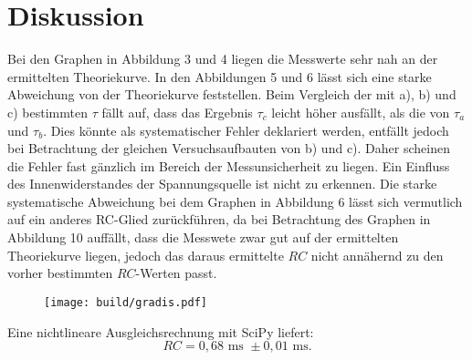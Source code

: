 \section{Diskussion}
\label{sec:Diskussion}\textbf{}
Bei den Graphen in Abbildung 3 und 4 liegen die Messwerte sehr nah an der ermittelten Theoriekurve. In den Abbildungen 5 und 6 lässt sich eine starke Abweichung von der Theoriekurve feststellen.
Beim Vergleich der mit a), b) und c) bestimmten $\tau$ fällt auf, dass das Ergebnis $\tau_c$ leicht höher ausfällt, als die von $\tau_a$ und $\tau_b$. Dies könnte als systematischer Fehler deklariert werden, entfällt jedoch bei Betrachtung der gleichen Versuchsaufbauten von b) und c). Daher scheinen die Fehler fast gänzlich im Bereich der Messunsicherheit zu liegen. Ein Einfluss des Innenwiderstandes der Spannungsquelle ist nicht zu erkennen. Die starke systematische Abweichung bei dem Graphen in Abbildung 6 lässt sich vermutlich auf ein anderes RC-Glied zurückführen, da bei Betrachtung des Graphen in Abbildung 10 auffällt, dass die Messwete zwar gut auf der ermittelten Theoriekurve liegen, jedoch das daraus ermittelte $RC$ nicht annähernd zu den vorher bestimmten $RC$-Werten passt.
\begin{figure}[H]
	\centering
	\caption{}
	\texttt{[image: build/gradis.pdf]}
	\label{fig:Dis}
\end{figure}
Eine nichtlineare Ausgleichsrechnung mit SciPy \cite{scipy} liefert:
\begin{displaymath}
RC=0,68 \text{ ms } \pm 0,01 \text{ ms.}
\end{displaymath}






	
